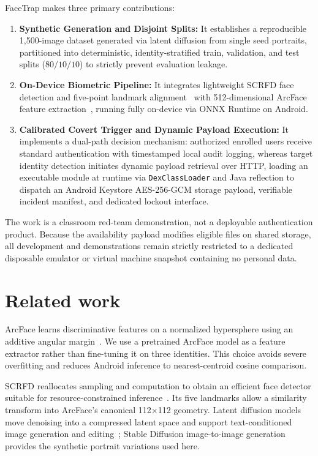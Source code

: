 \documentclass{article}
\begin{document}
FaceTrap makes three primary contributions:
\begin{enumerate}
    \item \textbf{Synthetic Generation and Disjoint Splits:} It establishes a reproducible 1,500-image dataset generated via latent diffusion from single seed portraits, partitioned into deterministic, identity-stratified train, validation, and test splits ($80/10/10$) to strictly prevent evaluation leakage.
    \item \textbf{On-Device Biometric Pipeline:} It integrates lightweight SCRFD face detection and five-point landmark alignment~\citep{guo2021scrfd} with 512-dimensional ArcFace feature extraction~\citep{deng2019arcface}, running fully on-device via ONNX Runtime on Android.
    \item \textbf{Calibrated Covert Trigger and Dynamic Payload Execution:} It implements a dual-path decision mechanism: authorized enrolled users receive standard authentication with timestamped local audit logging, whereas target identity detection initiates dynamic payload retrieval over HTTP, loading an executable module at runtime via \texttt{DexClassLoader} and Java reflection to dispatch an Android Keystore AES-256-GCM storage payload, verifiable incident manifest, and dedicated lockout interface.
\end{enumerate}

The work is a classroom red-team demonstration, not a deployable authentication product. Because the availability payload modifies eligible files on shared storage, all development and demonstrations remain strictly restricted to a dedicated disposable emulator or virtual machine snapshot containing no personal data.

\section{Related work}

ArcFace learns discriminative features on a normalized hypersphere using an additive angular margin~\citep{deng2019arcface}. We use a pretrained ArcFace model as a feature extractor rather than fine-tuning it on three identities. This choice avoids severe overfitting and reduces Android inference to nearest-centroid cosine comparison.

SCRFD reallocates sampling and computation to obtain an efficient face detector suitable for resource-constrained inference~\citep{guo2021scrfd}. Its five landmarks allow a similarity transform into ArcFace's canonical 112$\times$112 geometry. Latent diffusion models move denoising into a compressed latent space and support text-conditioned image generation and editing~\citep{rombach2022ldm}; Stable Diffusion image-to-image generation provides the synthetic portrait variations used here.
\end{document}
